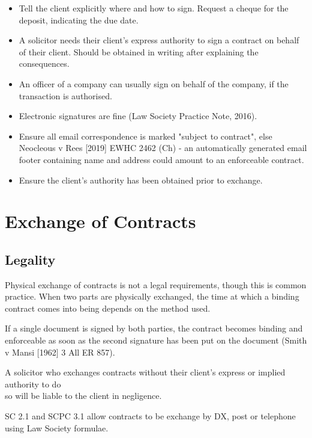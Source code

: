 \documentclass[
]{article}
\providecommand{\tightlist}{%
  \setlength{\itemsep}{0pt}\setlength{\parskip}{0pt}}
\begin{document}
\begin{itemize}
\tightlist
\item
  Tell the client explicitly where and how to sign. Request a cheque for
  the deposit, indicating the due date.
\item
  A solicitor needs their client's express authority to sign a contract
  on behalf of their client. Should be obtained in writing after
  explaining the consequences.
\item
  An officer of a company can usually sign on behalf of the company, if
  the transaction is authorised.
\item
  Electronic signatures are fine (Law Society Practice Note, 2016).
\item
  Ensure all email correspondence is marked "subject to contract", else
  Neocleous v Rees {[}2019{]} EWHC 2462 (Ch) - an automatically
  generated email footer containing name and address could amount to an
  enforceable contract.
\item
  Ensure the client's authority has been obtained prior to exchange.
\end{itemize}

\hypertarget{exchange-of-contracts}{%
\section{Exchange of Contracts}\label{exchange-of-contracts}}

\hypertarget{legality}{%
\subsection{Legality}\label{legality}}

Physical exchange of contracts is not a legal requirements, though this
is common practice. When two parts are physically exchanged, the time at
which a binding contract comes into being depends on the method used.

If a single document is signed by both parties, the contract becomes
binding and enforceable as soon as the second signature has been put on
the document (Smith v Mansi {[}1962{]} 3 All ER 857).

A solicitor who exchanges contracts without their client's express or
implied authority to do\\
so will be liable to the client in negligence.

SC 2.1 and SCPC 3.1 allow contracts to be exchange by DX, post or
telephone using Law Society formulae.
\end{document}

